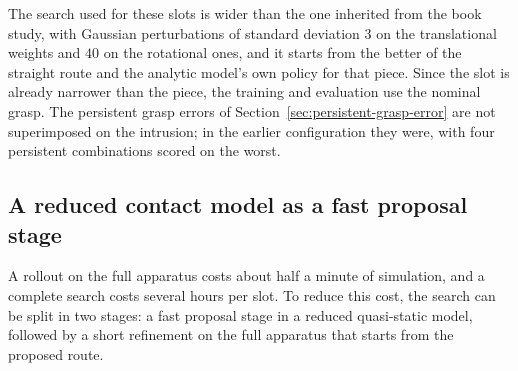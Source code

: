 The search used for these slots is wider than the one inherited from the book study, with Gaussian perturbations of standard deviation $3$ on the translational weights and $40$ on the rotational ones, and it starts from the better of the straight route and the analytic model's own policy for that piece. Since the slot is already narrower than the piece, the training and evaluation use the nominal grasp. The persistent grasp errors of Section~\ref{sec:persistent-grasp-error} are not superimposed on the intrusion; in the earlier configuration they were, with four persistent combinations scored on the worst.


\subsection{A reduced contact model as a fast proposal stage}

A rollout on the full apparatus costs about half a minute of simulation, and a complete search costs several hours per slot. To reduce this cost, the search can be split in two stages: a fast proposal stage in a reduced quasi-static model, followed by a short refinement on the full apparatus that starts from the proposed route.

